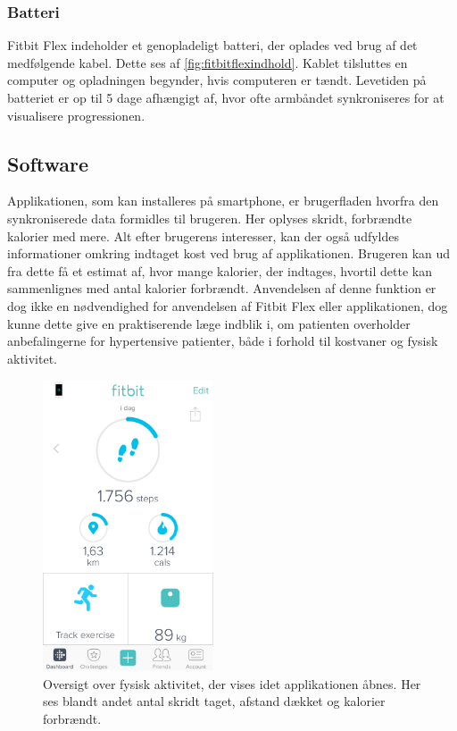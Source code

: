 \subsubsection{Batteri} 
Fitbit Flex indeholder et genopladeligt batteri, der oplades ved brug af det medfølgende kabel. Dette ses af \autoref{fig:fitbitflexindhold}. Kablet tilsluttes en computer og opladningen begynder, hvis computeren er tændt. 
Levetiden på batteriet er op til 5 dage afhængigt af, hvor ofte armbåndet synkroniseres for at visualisere progressionen.


\subsection{Software}
Applikationen, som kan installeres på smartphone, er brugerfladen hvorfra den synkroniserede data formidles til brugeren. Her oplyses skridt, forbrændte kalorier med mere. 
Alt efter brugerens interesser, kan der også udfyldes informationer omkring indtaget kost ved brug af applikationen. Brugeren kan ud fra dette få et estimat af, hvor mange kalorier, der indtages, hvortil dette kan sammenlignes med antal kalorier forbrændt. Anvendelsen af denne funktion er dog ikke en nødvendighed for anvendelsen af Fitbit Flex eller applikationen, dog kunne dette give en praktiserende læge indblik i, om patienten overholder anbefalingerne for hypertensive patienter, både i forhold til kostvaner og fysisk aktivitet. 

\begin{figure}[H]
	\centering
	\includegraphics[width=0.45\textwidth]{figures/burgerfladeoversigt}
	\caption{Oversigt over fysisk aktivitet, der vises idet applikationen åbnes. Her ses blandt andet antal skridt taget, afstand dækket og kalorier forbrændt.}
	\label{fig:brugerfladeoversigt}
\end{figure}

